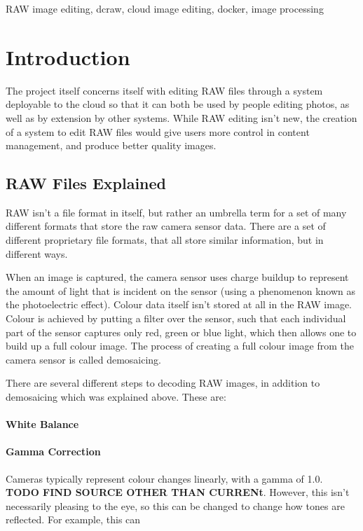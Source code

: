 \documentclass[12pt,a4paper]{article}
\begin{document}
\begin{keywords}
RAW image editing, dcraw, cloud image editing, docker, image processing
\end{keywords}

\section{Introduction}
The project itself concerns itself with editing RAW files through a system deployable to the cloud
so that it can both be used by people editing photos, as well as by extension by other systems. While RAW
editing isn't new, the creation of a system to edit RAW files would give users more control in content management,
and produce better quality images.


\subsection{RAW Files Explained}
RAW isn't a file format in itself, but rather an umbrella term for a set of many different formats that store the
raw camera sensor data. There are a set of different proprietary file formats, that all store similar information,
but in different ways. 

When an image is captured, the camera sensor uses charge buildup to represent the amount of light that is incident on the sensor
(using a phenomenon known as the photoelectric effect). Colour data itself isn't stored at all in the RAW image. Colour is achieved
by putting a filter over the sensor, such that each individual part of the sensor captures only red, green or blue light, which then
allows one to build up a full colour image. The process of creating a full colour image from the camera sensor is called demosaicing. 


There are several different steps to decoding RAW images, in addition to demosaicing which was explained above. These are:

\paragraph{White Balance}


\paragraph{Gamma Correction}
Cameras typically represent colour changes linearly, with a gamma of 1.0. \textbf{TODO FIND SOURCE OTHER THAN CURRENt}.
However, this isn't necessarily pleasing to the eye, so this can be changed to change how tones are reflected. For example, this can 
\end{document}
